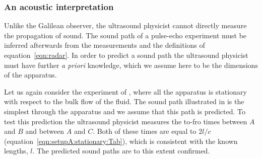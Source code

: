 \subsubsection{An acoustic interpretation}\label{sec:MMLorentzian}

Unlike the Galilean observer, the ultrasound physicist cannot directly measure the propagation of sound.
The sound path of a pulse-echo experiment must be inferred afterwards from the measurements and the  definitions of equation~\ref{eqn:radar}.
In order to  predict a  sound path the ultrasound physicist must have further {\em a priori}  knowledge,
which we assume here to be the dimensions  of the apparatus.


Let us again consider the experiment of ,
where all the apparatus is stationary with respect to the bulk flow of the fluid.
The sound path illustrated in   is the simplest through the apparatus and we assume
that this path is predicted.
%
To test this prediction the ultrasound  physicist measures the to-fro times between $A$ and $B$ and between
$A$ and  $C$.
Both of these times  are equal to $2l/c$ (equation~\ref{eqn:setupA:stationary:Tab}),
which is  consistent with the known lengths, $l$.
The predicted sound paths are to this extent confirmed.


